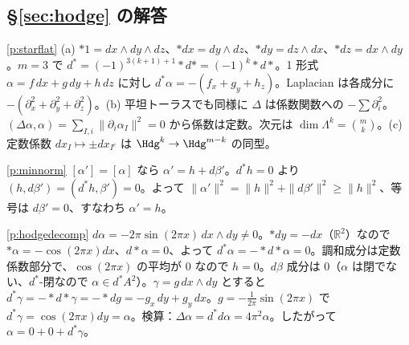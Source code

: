 \subsection*{\S\ref{sec:hodge} の解答}
\begin{sol}{\ref{p:starflat}}
(a) $\ast1=dx\wedge dy\wedge dz$、$\ast dx=dy\wedge dz$、$\ast dy=dz\wedge dx$、$\ast dz=dx\wedge dy$。$m=3$ で $d^*=(-1)^{3(k+1)+1}\ast d\ast=(-1)^k\ast d\ast$。1 形式 $\alpha=f\,dx+g\,dy+h\,dz$ に対し $d^*\alpha=-(f_x+g_y+h_z)$。Laplacian は各成分に $-(\partial_x^2+\partial_y^2+\partial_z^2)$。(b) 平坦トーラスでも同様に $\Delta$ は係数関数への $-\sum\partial_i^2$。$(\Delta\alpha,\alpha)=\sum_{I,i}\|\partial_i\alpha_I\|^2=0$ から係数は定数。次元は $\dim\Lambda^k=\binom mk$。(c) 定数係数 $dx_I\mapsto\pm dx_{I^c}$ は $\Hdg^k\to\Hdg^{m-k}$ の同型。
\end{sol}
\begin{sol}{\ref{p:minnorm}}
$[\alpha']=[\alpha]$ なら $\alpha'=h+d\beta'$。$d^*h=0$ より $(h,d\beta')=(d^*h,\beta')=0$。よって $\|\alpha'\|^2=\|h\|^2+\|d\beta'\|^2\ge\|h\|^2$、等号は $d\beta'=0$、すなわち $\alpha'=h$。
\end{sol}
\begin{sol}{\ref{p:hodgedecomp}}
$d\alpha=-2\pi\sin(2\pi x)\,dx\wedge dy\ne0$。$\ast dy=-dx$（$\mathbb R^2$）なので $\ast\alpha=-\cos(2\pi x)dx$、$d\ast\alpha=0$、よって $d^*\alpha=-\ast d\ast\alpha=0$。調和成分は定数係数部分で、$\cos(2\pi x)$ の平均が $0$ なので $h=0$。$d\beta$ 成分は $0$（$\alpha$ は閉でない、$d^*$-閉なので $\alpha\in d^*A^2$）。$\gamma=g\,dx\wedge dy$ とすると $d^*\gamma=-\ast d\ast\gamma=-\ast dg=-g_x\,dy+g_y\,dx$。$g=-\frac1{2\pi}\sin(2\pi x)$ で $d^*\gamma=\cos(2\pi x)dy=\alpha$。検算：$\Delta\alpha=d^*d\alpha=4\pi^2\alpha$。したがって $\alpha=0+0+d^*\gamma$。
\end{sol}

